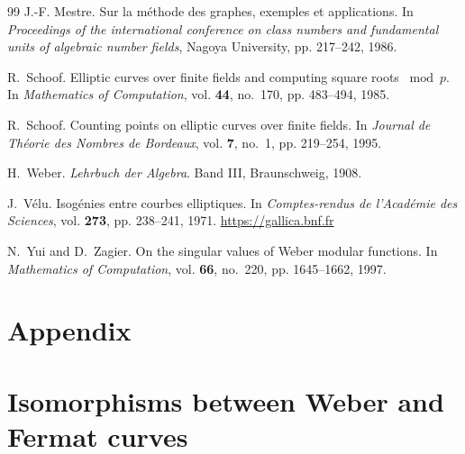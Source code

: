 \documentclass{amsart}
\begin{document}
\begin{thebibliography}{99}
  J.-F. Mestre.
  Sur la m\'ethode des graphes, exemples et applications.
  In {\em Proceedings of the international conference on class numbers and fundamental units of algebraic number fields},
  Nagoya University, pp. 217--242, 1986.

  R.~Schoof.
  Elliptic curves over finite fields and computing square roots $\bmod p$.
  In {\it Mathematics of Computation}, vol. {\bf 44}, no.~170, pp. 483--494, 1985.

  R.~Schoof.
  Counting points on elliptic curves over finite fields.
  In {\it Journal de Th{\'e}orie des Nombres de Bordeaux},
  vol. {\bf 7}, no.~1, pp. 219--254, 1995.

  H.~Weber. 
  {\it Lehrbuch der Algebra}.
  Band III, Braunschweig, 1908.

  J.~V\'elu.
  Isog\'enies entre courbes elliptiques.
  In {\it Comptes-rendus de l'Acad\'emie des Sciences}, vol. {\bf 273}, pp. 238--241, 1971.
  \url{https://gallica.bnf.fr}

  N.~Yui and D.~Zagier.
  On the singular values of Weber modular functions.
  In {\it Mathematics of Computation}, vol. {\bf 66}, no.~220, pp. 1645--1662, 1997.

\end{thebibliography}


\section*{Appendix}

\section*{Isomorphisms between Weber and Fermat curves}
  
\end{document}
